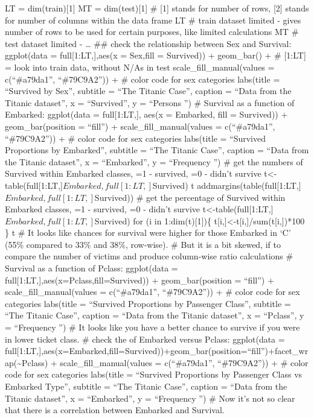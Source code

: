 \documentclass[
]{article}
\begin{document}
LT = dim(train){[}1{]} MT = dim(test){[}1{]} \# {[}1{]} stands for
number of rows, {[}2{]} stands for number of columns within the data
frame LT \# train dataset limited - gives number of rows to be used for
certain purposes, like limited calculations MT \# test dataset limited -
\ldots{} \#\# check the relationship between Sex and Survival:
ggplot(data = full{[}1:LT,{]},aes(x = Sex,fill = Survived)) +
geom\_bar() + \# {[}1:LT{]} = look into train data, without N/As in test
scale\_fill\_manual(values = c(``\#a79da1'', ``\#79C9A2'')) + \# color
code for sex categories labs(title = ``Survived by Sex'', subtitle =
``The Titanic Case'', caption = ``Data from the Titanic dataset'', x =
``\n Survived'', y = ``Persons \n'') \# Survival as a function of
Embarked: ggplot(data = full{[}1:LT,{]}, aes(x = Embarked, fill =
Survived)) + geom\_bar(position = ``fill'') + scale\_fill\_manual(values
= c(``\#a79da1'', ``\#79C9A2'')) + \# color code for sex categories
labs(title = ``Survived Proportions by Embarked'', subtitle = ``The
Titanic Case'', caption = ``Data from the Titanic dataset'', x =
``\n Embarked'', y = ``Frequency \n'') \# get the numbers of Survived
within Embarked classes, =1 - survived, =0 - didn't survive
t\textless-table(full{[}1:LT,{]}\(Embarked,full[1:LT,]\)Survived) t
addmargins(table(full{[}1:LT,{]}\(Embarked,full[1:LT,]\)Survived)) \#
get the percentage of Survived within Embarked classes, =1 - survived,
=0 - didn't survive
t\textless-table(full{[}1:LT,{]}\(Embarked,full[1:LT,]\)Survived) for (i
in 1:dim(t){[}1{]})\{ t{[}i,{]}\textless-t{[}i,{]}/sum(t{[}i,{]})*100 \}
t \# It looks like chances for survival were higher for those Embarked
in `C' (55\% compared to 33\% and 38\%, row-wise). \# But it is a bit
skewed, if to compare the number of victims and produce column-wise
ratio calculations \# Survival as a function of Pclass: ggplot(data =
full{[}1:LT,{]},aes(x=Pclass,fill=Survived)) + geom\_bar(position =
``fill'') + scale\_fill\_manual(values = c(``\#a79da1'', ``\#79C9A2''))
+ \# color code for sex categories labs(title = ``Survived Proportions
by Passenger Class'', subtitle = ``The Titanic Case'', caption = ``Data
from the Titanic dataset'', x = ``\n Pclass'', y = ``Frequency \n'') \#
It looks like you have a better chance to survive if you were in lower
ticket class. \# check the of Embarked versus Pclass: ggplot(data =
full{[}1:LT,{]},aes(x=Embarked,fill=Survived))+geom\_bar(position=``fill'')+facet\_wrap(\textasciitilde Pclass)
+ scale\_fill\_manual(values = c(``\#a79da1'', ``\#79C9A2'')) + \# color
code for sex categories labs(title = ``Survived Proportions by Passenger
Class vs Embarked Type'', subtitle = ``The Titanic Case'', caption =
``Data from the Titanic dataset'', x = ``\n Embarked'', y = ``Frequency
\n'') \# Now it's not so clear that there is a correlation between
Embarked and Survival.
\end{document}
